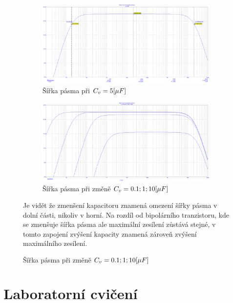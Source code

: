 \documentclass{article}
\begin{document}
\begin{figure}[H]
	\begin{minipage}[t]{1\textwidth}
    \begin{figure}[H]
      \includegraphics[width=\textwidth]{PC/UNI/UNI_sirka_pasma_2.png}
      \caption{\label{sirka_pasma} Šířka pásma při \(C_v = 5\-[\mu F]\)}
    \end{figure}
    \begin{figure}[H]
      \includegraphics[width=\textwidth]{PC/UNI/UNI_sirky_pasma.png}
      \caption{\label{Pohyb_sirky_pasma} Šířka pásma při změně \(C_v = 0.1;1;10\-[\mu F]\)}
    \end{figure}
  \end{minipage}
  \begin{minipage}[t]{1\textwidth}
    Je vidět že zmenšení kapacitoru znamená omezení šířky pásma v dolní části, nikoliv v horní.
    Na rozdíl od bipolárního tranzistoru, kde se zmenšuje šířka pásma ale maximální zesílení zůstává stejné, v tomto zapojení zvýšení kapacity znamená zároveň zvýšení maximálního zesílení.
  \end{minipage}
\end{figure}

\newpage
\section{Laboratorní cvičení}
\end{document}
